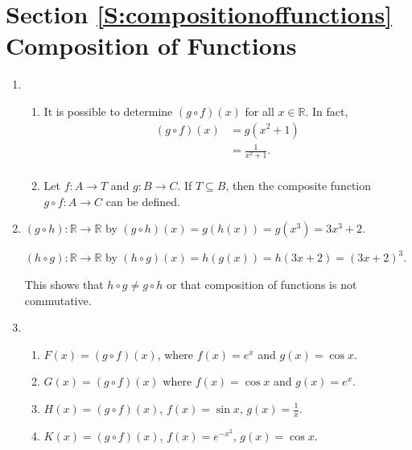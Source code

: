\section*{Section \ref{S:compositionoffunctions} Composition of Functions}

\begin{enumerate}
\item \begin{enumerate}
\item It is possible to determine $\left( {g \circ f} \right)\left( x \right)$  for all  
$x \in \mathbb{R}$.  In fact,
\[
\begin{aligned}
\left( {g \circ f} \right)\left( x \right) &= g \left( x^2 + 1 \right) \\
                                           &= \frac{1}{x^2 + 1}. \\
\end{aligned}
\]
\item Let  $f:A \to T$ and  $g:B \to C$.  If $T \subseteq B$, then the composite function 
$g \circ f:A \to C$ can be defined.
\end{enumerate}


\item $( {g \circ h} ):\mathbb{R} \to \mathbb{R}$  by  
$( {g \circ h} )( x ) = g( {h( x )} ) = g\!\left( {x^3 } \right) = 3x^3  + 2$.

$( {h \circ g} ):\mathbb{R} \to \mathbb{R}$  by  
$( {h \circ g} )( x ) = h( {g( x )} ) = h( {3x + 2} ) = ( {3x + 2} )^3 $.

\noindent
This shows that $h \circ g \ne g \circ h$ or that composition of functions is not commutative.


\item \begin{enumerate}
\item $F\left( x \right) = \left( {g \circ f} \right)\left( x \right)$, where 
$f\left( x \right) = e^x$  and $g\left( x \right) = \cos x$.

\item $G\left( x \right) = \left( {g \circ f} \right)\left( x \right)$ where 
$f\left( x \right) = \cos x$ and $g\left( x \right) = e^x $.

\item $H\left( x \right) = \left( {g \circ f} \right)\left( x \right)$, 
$f\left( x \right) = \sin x$, $g\left( x \right) = \frac{1}{x}$.

\item $K\left( x \right) = \left( {g \circ f} \right)\left( x \right)$, 
$f\left( x \right) = e^{-x^2}$, $g\left( x \right) = \cos x$.
\end{enumerate}





\end{enumerate}
